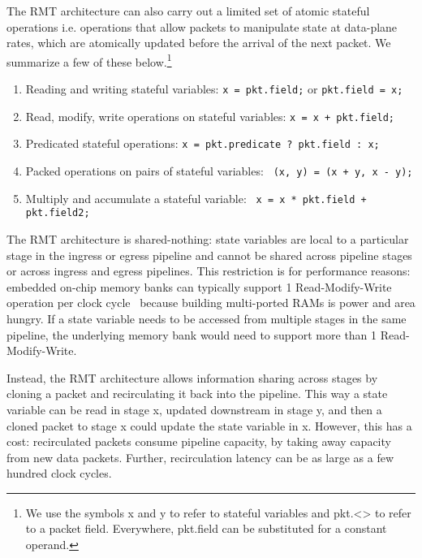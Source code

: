 The RMT architecture can also carry out a limited set of
atomic stateful operations i.e. operations that allow packets to manipulate
state at data-plane rates, which are atomically updated before the arrival of the next packet.
We summarize a few of these below.\footnote{We use the
symbols x and y to refer to stateful variables and pkt.<> to refer to a packet field.
Everywhere, pkt.field can be substituted for a constant operand.}
\begin{enumerate}
\item Reading and writing stateful variables:
      \texttt{x = pkt.field;} or \texttt{pkt.field = x;}
\item Read, modify, write operations on stateful variables:
      \texttt{x = x + pkt.field;}
\item Predicated stateful operations: \texttt{x = pkt.predicate ? pkt.field : x;}
\item Packed operations on pairs of stateful variables: \texttt{ (x, y) = (x + y, x - y);}
\item Multiply and accumulate a stateful variable: \texttt{ x = x * pkt.field + pkt.field2; }
\end{enumerate}

The RMT architecture is shared-nothing: state variables are local to a
particular stage in the ingress or egress pipeline and cannot be shared across
pipeline stages or across ingress and egress pipelines. This restriction is for
performance reasons: embedded on-chip memory banks can typically support 1
Read-Modify-Write operation per clock cycle~\cite{some_citation_from_memoir}
because building multi-ported RAMs is power and area hungry. If a state
variable needs to be accessed from multiple stages in the same pipeline, the
underlying memory bank would need to support more than 1 Read-Modify-Write.

Instead, the RMT architecture allows information sharing across stages by cloning a packet
and recirculating it back into the pipeline. This way a state variable can be
read in stage x, updated downstream in stage y, and then a cloned packet to
stage x could update the state variable in x. However, this has a cost:
recirculated packets consume pipeline capacity, by taking away capacity from
new data packets.  Further, recirculation latency can be as large as a few
hundred clock cycles.
